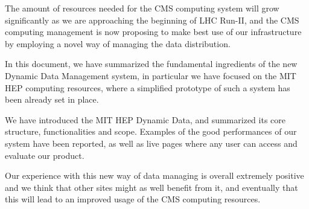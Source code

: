 The amount of resources needed for the CMS computing system will grow significantly as we are approaching the 
beginning of LHC Run-II, and the CMS computing management is now proposing to make best use of our infrastructure by employing a 
novel way of managing the data distribution.

In this document, we have summarized the fundamental ingredients of the new Dynamic Data Management system, in particular
we have focused on the MIT HEP computing resources, where a simplified prototype of such a system has been already set in place.

We have introduced the MIT HEP Dynamic Data, and summarized its core structure, functionalities and scope.
Examples of the good performances of our system have been reported, as well as live pages where any user can access and 
evaluate our product. 

Our experience with this new way of data managing is overall extremely positive and we think that other sites might as well 
benefit from it, and eventually that this will lead to an improved usage of the CMS computing resources.
